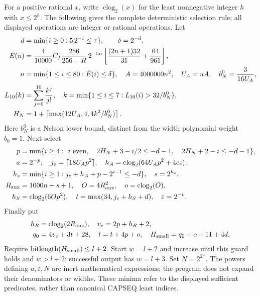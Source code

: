 \documentclass[11pt]{article}
\theoremstyle{plain}
\theoremstyle{definition}
\theoremstyle{remark}
\begin{document}
For a positive rational $x$, write $\operatorname{clog}_2(x)$ for the
least nonnegative integer $h$ with $x\le2^h$. The following gives the
complete deterministic selection rule; all displayed operations are
integer or rational operations. Let
\begin{align}\label{vqal:acc-spatial}
 d&=\min\{i\ge0:5\,2^{-i}\le\tau\},\qquad\delta=2^{-d},\nonumber\\
 \bar E(n)&={4\over10000}\bar C_f{256\over256-R}\,2^{-5n}
                   \left[{(2n+1)32\over31}+{64\over961}\right],\nonumber\\
 n&=\min\{1\le i\le80:\bar E(i)\le\delta\},\quad
 A=4000000n^2,\quad U_A=uA,\quad b_N^0={3\over16U_A},\nonumber\\
 L_{10}(k)&=\sum_{j=0}^{10}{k^j\over j!},\quad
 k=\min\{1\le i\le7:L_{10}(i)>32/b_N^0\},\nonumber\\
 H_N&=1+\left\lceil\max(12U_A,4,4k^2/b_N^0)\right\rceil.
\end{align}
Here $b_N^0$ is a Nelson lower bound, distinct from the width polynomial
weight $b_0=1$. Next select
\begin{align}\label{vqal:acc-outer}
 p&=\min\{i\ge4:\ i\text{ even},\quad
       2H_N+3-i/2\le-d-1,\quad2H_N+2-i\le-d-1\},\nonumber\\
 a&=2^{-p},\quad j_e=\lceil18U_Ap^2\rceil,\quad
 h_A=\operatorname{clog}_2(64U_Ap^2+4c_r),\nonumber\\
 h_s&=\min\{i\ge1:j_e+h_A+p-2^{i-1}\le-d\},\quad s=2^{h_s},\nonumber\\
 R_{\rm aux}&=1000n+s+1,\quad O=4R_{\rm aux}^2,
 \quad o=\operatorname{clog}_2(O),\nonumber\\
 h_S&=\operatorname{clog}_2(6Op^2),\quad
 t=\max(34,j_e+h_S+d),\quad\varepsilon=2^{-t}.
\end{align}
Finally put
\begin{align}\label{vqal:acc-width}
 h_R&=\operatorname{clog}_2(2R_{\rm aux}),\quad v_e=2p+h_R+2,\nonumber\\
 q_0&=4v_e+3t+28,\quad l=t+4p+o,
 \quad H_{\rm small}=q_0+o+11+4d.
\end{align}
Require $\operatorname{bitlength}(H_{\rm small})\le l+2$.
Start $w=l+2$ and increase until this guard holds and $w>l+2$;
successful output has $w=l+3$. Set $N=2^{2^w}$. The powers defining
$a,\varepsilon,N$ are inert mathematical expressions; the program
does not expand their denominators or widths. These minima refer to the
displayed sufficient predicates, rather than canonical CAPSEQ least indices.
\end{document}
